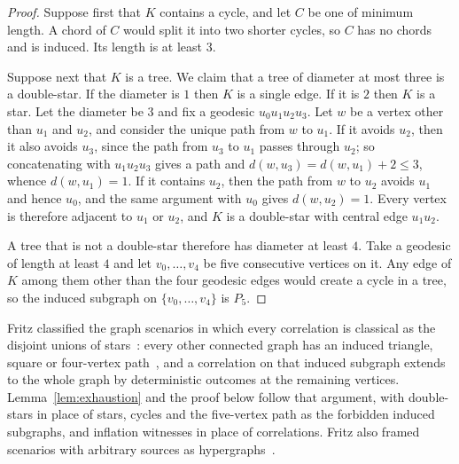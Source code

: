 \documentclass[11pt]{article}
\theoremstyle{plain}
\theoremstyle{definition}
\begin{document}
\begin{proof}
Suppose first that $K$ contains a cycle, and let $C$ be one of minimum length. A chord of $C$ would split it into two shorter cycles, so $C$ has no chords and is induced. Its length is at least $3$.

Suppose next that $K$ is a tree. We claim that a tree of diameter at most three is a double-star. If the diameter is $1$ then $K$ is a single edge. If it is $2$ then $K$ is a star. Let the diameter be $3$ and fix a geodesic $u_0u_1u_2u_3$. Let $w$ be a vertex other than $u_1$ and $u_2$, and consider the unique path from $w$ to $u_1$. If it avoids $u_2$, then it also avoids $u_3$, since the path from $u_3$ to $u_1$ passes through $u_2$; so concatenating with $u_1u_2u_3$ gives a path and $d(w,u_3)=d(w,u_1)+2\le3$, whence $d(w,u_1)=1$. If it contains $u_2$, then the path from $w$ to $u_2$ avoids $u_1$ and hence $u_0$, and the same argument with $u_0$ gives $d(w,u_2)=1$. Every vertex is therefore adjacent to $u_1$ or $u_2$, and $K$ is a double-star with central edge $u_1u_2$.

A tree that is not a double-star therefore has diameter at least $4$. Take a geodesic of length at least $4$ and let $v_0,\dots,v_4$ be five consecutive vertices on it. Any edge of $K$ among them other than the four geodesic edges would create a cycle in a tree, so the induced subgraph on $\{v_0,\dots,v_4\}$ is $P_5$.
\end{proof}

Fritz classified the graph scenarios in which every correlation is classical as the disjoint unions of stars~\cite[Theorem 3.8]{Fritz2012}: every other connected graph has an induced triangle, square or four-vertex path~\cite[Lemma 3.9]{Fritz2012}, and a correlation on that induced subgraph extends to the whole graph by deterministic outcomes at the remaining vertices. Lemma~\ref{lem:exhaustion} and the proof below follow that argument, with double-stars in place of stars, cycles and the five-vertex path as the forbidden induced subgraphs, and inflation witnesses in place of correlations. Fritz also framed scenarios with arbitrary sources as hypergraphs~\cite[Section 3]{Fritz2012}.
\end{document}
